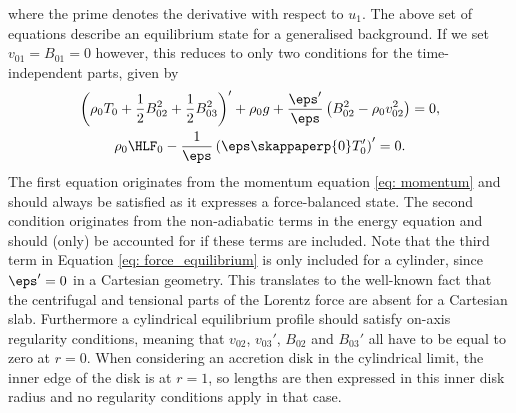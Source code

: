 \endgroup
where the prime denotes the derivative with respect to $u_1$. The above set of equations describe an equilibrium state for a generalised background. If we set $v_{01} = B_{01} = 0$ however, this reduces to only two conditions for the time-independent parts, given by
\begin{gather}
  \left(\rho_0 T_0 + \frac{1}{2}B_{02}^2 + \frac{1}{2}B_{03}^2\right)'
    + \rho_0 g
    + \frac{\eps'}{\eps}\left(B_{02}^2 - \rho_0 v_{02}^2\right) = 0, \label{eq: force_equilibrium} \\
  \rho_0 \HLF_0 - \frac{1}{\eps}\left(\eps \skappaperp{0} T_0'\right)' = 0. \label{eq: thermal_equilibrium}
\end{gather}
The first equation originates from the momentum equation \eqref{eq: momentum} and should always be satisfied as it expresses a force-balanced state. The second condition originates from the non-adiabatic terms in the energy equation and should (only) be accounted for if these terms are included. Note that the third term in Equation \eqref{eq: force_equilibrium} is only included for a cylinder, since $\eps' = 0$ in a Cartesian geometry. This translates to the well-known fact that the centrifugal and tensional parts of the Lorentz force are absent for a Cartesian slab. Furthermore a cylindrical equilibrium profile should satisfy on-axis regularity conditions, meaning that $v_{02}$, $v_{03}'$, $B_{02}$ and $B_{03}'$ all have to be equal to zero at $r = 0$. When considering an accretion disk in the cylindrical limit, the inner edge of the disk is at $r = 1$, so lengths are then expressed in this inner disk radius and no regularity conditions apply in that case.


